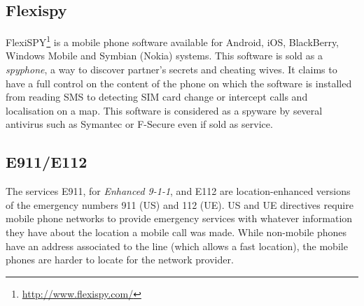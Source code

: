 


\subsection{Flexispy}
\label{sec:flexispy}

FlexiSPY\footnote{\url{http://www.flexispy.com/}} is a mobile phone software available for Android, iOS, BlackBerry, Windows Mobile and Symbian (Nokia) systems.
This software is sold as a \emph{spyphone}, a way to discover partner's secrets and cheating wives.
It claims to have a full control on the content of the phone on which the software is installed from reading SMS to detecting SIM card change or intercept calls and localisation on a map.
This software is considered as a spyware by several antivirus such as Symantec or F-Secure even if sold as service.

\subsection{E911/E112}
\label{sec:soa-911}

The services E911, for \emph{Enhanced 9-1-1}, and E112 are location-enhanced versions of the emergency numbers 911 (US) and 112 (UE).
US and UE directives require mobile phone networks to provide emergency services with whatever information they have about the location a mobile call was made.
While non-mobile phones have an address associated to the line (which allows a fast location), the mobile phones are harder to locate for the network provider.


